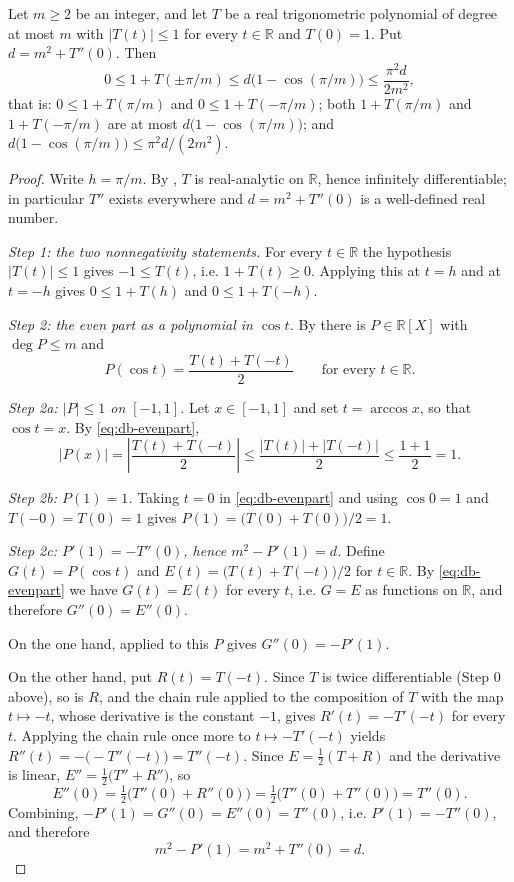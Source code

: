 \begin{lemma}
Let $m\ge2$ be an integer, and let $T$ be a real trigonometric polynomial of
degree at most $m$ with $\lvert T(t)\rvert\le1$ for every $t\in\mathbb{R}$ and
$T(0)=1$. Put $d=m^2+T''(0)$. Then
\[
  0\le1+T(\pm\pi/m)\le d\bigl(1-\cos(\pi/m)\bigr)\le\frac{\pi^2d}{2m^2},
\]
that is: $0\le1+T(\pi/m)$ and $0\le1+T(-\pi/m)$; both $1+T(\pi/m)$ and
$1+T(-\pi/m)$ are at most $d\bigl(1-\cos(\pi/m)\bigr)$; and
$d\bigl(1-\cos(\pi/m)\bigr)\le\pi^2d/(2m^2)$.
\end{lemma}
\begin{proof}
Write $h=\pi/m$. By , $T$ is real-analytic on
$\mathbb{R}$, hence infinitely differentiable; in particular $T''$ exists
everywhere and $d=m^2+T''(0)$ is a well-defined real number.

\emph{Step 1: the two nonnegativity statements.} For every $t\in\mathbb{R}$ the
hypothesis $\lvert T(t)\rvert\le1$ gives $-1\le T(t)$, i.e. $1+T(t)\ge0$.
Applying this at $t=h$ and at $t=-h$ gives $0\le1+T(h)$ and $0\le1+T(-h)$.

\emph{Step 2: the even part as a polynomial in $\cos t$.} By
 there is $P\in\mathbb{R}[X]$ with $\deg P\le m$ and
\begin{equation}\label{eq:db-evenpart}
  P(\cos t)=\frac{T(t)+T(-t)}{2}\qquad\text{for every }t\in\mathbb{R}.
\end{equation}

\emph{Step 2a: $\lvert P\rvert\le1$ on $[-1,1]$.} Let $x\in[-1,1]$ and set
$t=\arccos x$, so that $\cos t=x$. By \eqref{eq:db-evenpart},
\[
  \lvert P(x)\rvert=\left\lvert\frac{T(t)+T(-t)}{2}\right\rvert
  \le\frac{\lvert T(t)\rvert+\lvert T(-t)\rvert}{2}\le\frac{1+1}{2}=1 .
\]

\emph{Step 2b: $P(1)=1$.} Taking $t=0$ in \eqref{eq:db-evenpart} and using
$\cos0=1$ and $T(-0)=T(0)=1$ gives $P(1)=\bigl(T(0)+T(0)\bigr)/2=1$.

\emph{Step 2c: $P'(1)=-T''(0)$, hence $m^2-P'(1)=d$.} Define
$G(t)=P(\cos t)$ and $E(t)=\bigl(T(t)+T(-t)\bigr)/2$ for $t\in\mathbb{R}$. By
\eqref{eq:db-evenpart} we have $G(t)=E(t)$ for every $t$, i.e. $G=E$ as
functions on $\mathbb{R}$, and therefore $G''(0)=E''(0)$.

On the one hand,  applied to this $P$ gives
$G''(0)=-P'(1)$.

On the other hand, put $R(t)=T(-t)$. Since $T$ is twice differentiable (Step 0
above), so is $R$, and the chain rule applied to the composition of $T$ with the
map $t\mapsto-t$, whose derivative is the constant $-1$, gives
$R'(t)=-T'(-t)$ for every $t$. Applying the chain rule once more to
$t\mapsto -T'(-t)$ yields $R''(t)=-\bigl(-T''(-t)\bigr)=T''(-t)$. Since
$E=\tfrac12(T+R)$ and the derivative is linear, $E''=\tfrac12\bigl(T''+R''\bigr)$,
so
\[
  E''(0)=\tfrac12\bigl(T''(0)+R''(0)\bigr)=\tfrac12\bigl(T''(0)+T''(0)\bigr)=T''(0).
\]
Combining, $-P'(1)=G''(0)=E''(0)=T''(0)$, i.e. $P'(1)=-T''(0)$, and therefore
\begin{equation}\label{eq:db-deficit}
  m^2-P'(1)=m^2+T''(0)=d .
\end{equation}


\end{proof}
